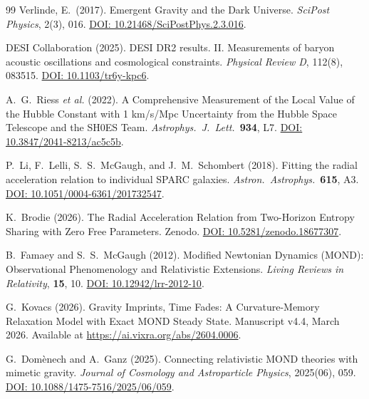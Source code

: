 \documentclass[aps,prd,twocolumn,superscriptaddress,nofootinbib]{revtex4-2}
\begin{document}
\begin{thebibliography}{99}
Verlinde, E.\ (2017).
Emergent Gravity and the Dark Universe.
\textit{SciPost Physics}, 2(3), 016.
\href{https://doi.org/10.21468/SciPostPhys.2.3.016}{DOI: 10.21468/SciPostPhys.2.3.016}.

DESI Collaboration (2025).
DESI DR2 results. II. Measurements of baryon acoustic oscillations and cosmological constraints.
\textit{Physical Review D}, 112(8), 083515.
\href{https://doi.org/10.1103/tr6y-kpc6}{DOI: 10.1103/tr6y-kpc6}.

A.~G.~Riess \textit{et al.} (2022).
A Comprehensive Measurement of the Local Value of the Hubble Constant with 1 km/s/Mpc Uncertainty from the Hubble Space Telescope and the SH0ES Team.
\textit{Astrophys.\ J.\ Lett.}\ \textbf{934}, L7.
\href{https://doi.org/10.3847/2041-8213/ac5c5b}{DOI: 10.3847/2041-8213/ac5c5b}.

P.~Li, F.~Lelli, S.~S.~McGaugh, and J.~M.~Schombert (2018).
Fitting the radial acceleration relation to individual SPARC galaxies.
\textit{Astron.\ Astrophys.}\ \textbf{615}, A3.
\href{https://doi.org/10.1051/0004-6361/201732547}{DOI: 10.1051/0004-6361/201732547}.

K.~Brodie (2026).
The Radial Acceleration Relation from Two-Horizon Entropy Sharing with Zero Free Parameters.
Zenodo. \href{https://doi.org/10.5281/zenodo.18677307}{DOI: 10.5281/zenodo.18677307}.

B.~Famaey and S.~S.~McGaugh (2012).
Modified Newtonian Dynamics (MOND): Observational Phenomenology and Relativistic Extensions.
\textit{Living Reviews in Relativity}, \textbf{15}, 10.
\href{https://doi.org/10.12942/lrr-2012-10}{DOI: 10.12942/lrr-2012-10}.

G.~Kovacs (2026).
Gravity Imprints, Time Fades: A Curvature-Memory Relaxation Model with Exact MOND Steady State.
Manuscript v4.4, March 2026.
Available at \url{https://ai.vixra.org/abs/2604.0006}.

G.~Dom\`enech and A.~Ganz (2025).
Connecting relativistic MOND theories with mimetic gravity.
\textit{Journal of Cosmology and Astroparticle Physics}, 2025(06), 059.
\href{https://doi.org/10.1088/1475-7516/2025/06/059}{DOI: 10.1088/1475-7516/2025/06/059}.

\end{thebibliography}
\end{document}
